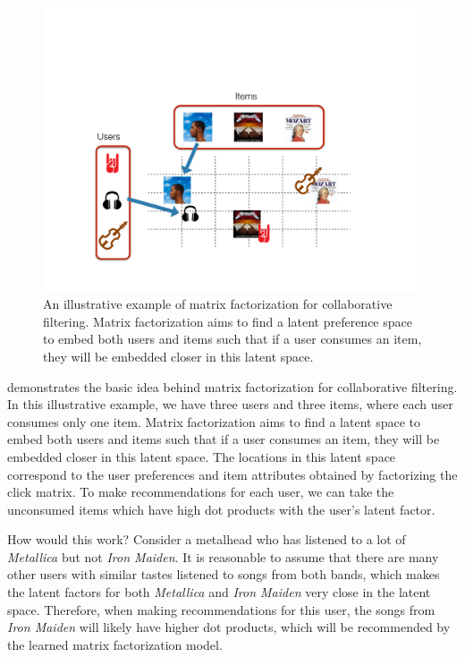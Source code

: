 \begin{figure}
  \centering
    \includegraphics[width=\textwidth]{fig/cf_cartoon}
      \caption{An illustrative example of matrix factorization for collaborative filtering. Matrix factorization aims to find a latent preference space to embed both users and items such that if a user consumes an item, they will be embedded closer in this latent space.}
      \label{chpt:background:fig:cf_cartoon}
\end{figure}

 demonstrates the basic idea behind matrix factorization for collaborative filtering. In this illustrative example, we have three users and three items, where each user consumes only one item. Matrix factorization aims to find a latent space to embed both users and items such that if a user consumes an item, they will be embedded closer in this latent space. The locations in this latent space correspond to the user preferences and item attributes obtained by factorizing the click matrix. To make recommendations for each user, we can take the unconsumed items which have high dot products with the user's latent factor. 

How would this work? Consider a metalhead who has listened to a lot of \textit{Metallica} but not \textit{Iron Maiden}. It is reasonable to assume that there are many other users with similar tastes listened to songs from both bands, which makes the latent factors for both \textit{Metallica} and \textit{Iron Maiden} very close in the latent space. Therefore, when making recommendations for this user, the songs from \textit{Iron Maiden} will likely have higher dot products, which will be recommended by the learned matrix factorization model.  

